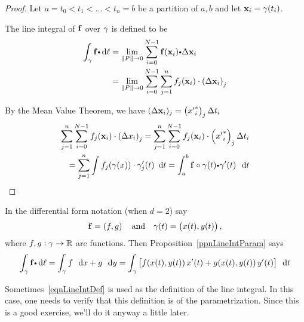\begin{proof}

Let $a=t_0<t_1<\dots<t_n=b$ be a partition of $a,b$ and let $\mathbf{ x}_i=\gamma(t_i)$.

   The line integral  of $\mathbf{ f}$ over $\gamma$ is defined to be
    \begin{align*}
      \dint_\caminho \funvect{f} \bp \dif \ell &= \lim_{\norm{P} \to 0}
	\sum_{i = 0}^{N-1} \funvect{f}(  \vector{x}_i ) \bp \Delta\vector{x}_i \\
	&=	\lim_{\norm{P} \to 0}
	\sum_{i = 0}^{N-1} \sum_{j = 1}^{n}  f_j(  \vector{x}_i ) \cdot\left(\Delta \vector{x}_i \right)_j
    \end{align*}
  
By the Mean Value Theorem, we have $(\Delta \mathbf{ x}_i)_j =\left( {x'}_i^* \right)_j \Delta t_i$
 \begin{align*}
	\sum_{j = 1}^{n} \sum_{i = 0}^{N-1}   f_j(  \vector{x}_i ) \cdot \left(\Delta {x}_i \right)_j =	\sum_{j = 1}^{n} \sum_{i = 0}^{N-1}   f_j(  \vector{x}_i ) \cdot \left( {x'}_i^* \right)_j \Delta t_i \\
	=	\sum_{j = 1}^{n} \int f_j(\gamma(x)) \cdot \gamma'_j(t) \dt
	= \dint_a^b \funvect{f} \circ \gamma(t) \bp \gamma'(t) \, \dt
\end{align*}


\end{proof}
  
  
  
  
  In the differential form notation (when $d = 2$) say
  \begin{equation*}
    \mathbf{ f} = \left(f,g\right)
    \quad\text{and}\quad
    \gamma(t) = \left(x(t),y(t)\right),
  \end{equation*}
  where $f, g: \gamma \to \mathbb{R}$ are functions.
  Then Proposition~\ref{ppnLineIntParam} says
  \begin{equation*}
    \dint_\caminho \funvect{f} \bp \dif \ell
      = \dint_\caminho f \, \dx + g \, \dy
      = \dint_\caminho \left[
	  f(x(t), y(t)) \, x'(t) + 
	  g(x(t), y(t)) \, y'(t) \right] \, \dt
  \end{equation*}

  \begin{remark}
    Sometimes~\eqref{eqnLineIntDef} is used as the definition of the line integral.
    In this case, one needs to verify that this definition is  of the parametrization.
    Since this is a good exercise, we'll do it anyway a little later.
  \end{remark}

